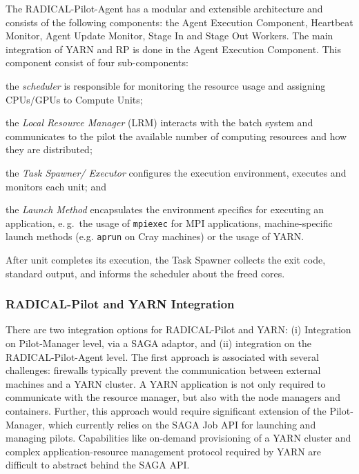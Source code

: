 The RADICAL-Pilot-Agent has a modular and extensible architecture and consists of the following components: the Agent Execution Component, Heartbeat Monitor, Agent Update Monitor, Stage In and Stage Out Workers.
The main integration of YARN and RP is done in the Agent Execution Component.
This component consist of four sub-components:
\begin{inparaenum}[a)]
    \item the \textit{scheduler} is responsible for monitoring the resource usage and assigning CPUs/GPUs to Compute Units;
    \item the \textit{Local Resource Manager} (LRM) interacts with the batch system and communicates to the pilot the available number of computing resources and how they are distributed;
    \item the \textit{Task Spawner/ Executor} configures the execution environment, executes and monitors each unit; and
    \item the \textit{Launch Method} encapsulates the environment specifics for executing an application, e.\,g.\ the usage of \texttt{mpiexec} for MPI applications, machine-specific launch methods (e.g. \texttt{aprun} on Cray machines) or the usage of YARN.
\end{inparaenum}
After unit completes its execution, the Task Spawner collects the exit code, standard output, and informs the scheduler about the freed cores.

\subsubsection*{RADICAL-Pilot and YARN Integration}
\label{sssec:rp-yarn}

There are two integration options for RADICAL-Pilot and YARN: (i) Integration on Pilot-Manager level, via a SAGA adaptor, and (ii) integration on the RADICAL-Pilot-Agent level.
The first approach is associated with several challenges: firewalls typically prevent the communication between external machines and a YARN cluster.
A YARN application is not only required to communicate with the resource manager, but also with the node managers and containers.
Further, this approach would require significant extension of the Pilot-Manager, which currently relies on the SAGA Job API for launching and managing pilots.
Capabilities like on-demand provisioning of a YARN cluster and complex application-resource management protocol required by YARN are difficult to abstract behind the SAGA API.

